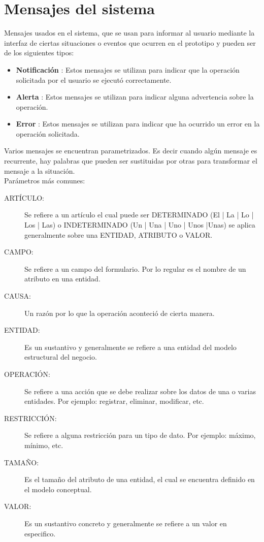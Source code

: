 
\section{Mensajes del sistema}

Mensajes usados en el sistema, que se usan para informar al usuario mediante la interfaz de ciertas situaciones o eventos que ocurren en el prototipo y pueden ser de los siguientes tipos: \\
\begin{itemize}	
	\item \textbf{Notificación} : Estos mensajes se utilizan para indicar que la operación solicitada por el usuario se ejecutó correctamente.
	\item \textbf{Alerta} : Estos mensajes se utilizan para indicar alguna advertencia sobre la operación.
	\item \textbf{Error} : Estos mensajes se utilizan para indicar que ha ocurrido un error en la operación solicitada.
\end{itemize}	

Varios mensajes se encuentran parametrizados. Es decir cuando algún mensaje es recurrente, hay palabras que pueden ser sustituidas por otras para transformar el mensaje a la situación. \\

Parámetros más comunes: \\

\begin{description}
	\item[ARTÍCULO: ] Se refiere a un artículo el cual puede ser DETERMINADO (El | La | Lo | Los | Las) o INDETERMINADO (Un | Una | Uno | Unos |Unas) se aplica generalmente sobre una ENTIDAD, ATRIBUTO o VALOR.
	\item[CAMPO: ] Se refiere a un campo del formulario. Por lo regular es el nombre de un atributo en una entidad.
	\item[CAUSA: ] Un razón por lo que la operación aconteció de cierta manera.
	\item[ENTIDAD: ] Es un sustantivo y generalmente se refiere a una entidad del modelo estructural del negocio.
	\item[OPERACIÓN: ] Se refiere a una acción que se debe realizar sobre los datos de una o varias entidades. Por ejemplo: registrar, eliminar, modificar, etc.
	\item[RESTRICCIÓN: ] Se refiere a alguna restricción para un tipo de dato. Por ejemplo: máximo, mínimo, etc.
	\item[TAMAÑO: ] Es el tamaño del atributo de una entidad, el cual se encuentra definido en el modelo conceptual.
	\item[VALOR: ] Es un sustantivo concreto y generalmente se refiere a un valor en especifico.
\end{description}

